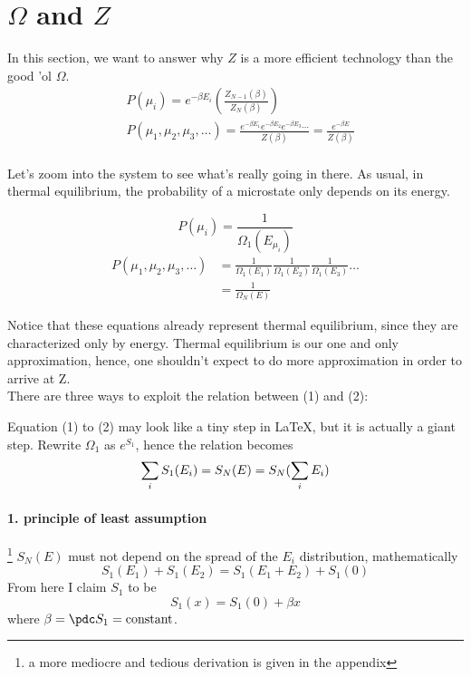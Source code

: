 

\usepackage{multicol}



    \section{$\Omega$ and $Z$}
    \newcommand{\ThE}{thermal equilibrium}
        
        In this section, we want to answer why $Z$ is a more efficient technology than the good 'ol $\Omega$.
        \begin{align*}
            &P(\mu_i) = e^{-\beta E_i}
            \left( \frac{Z_{N-1}(\beta)}{Z_N(\beta)}\right)\\
            &P(\mu_1,\mu_2,\mu_3,\ldots) = \frac{e^{-\beta E_1} e^{-\beta E_2} e^{-\beta E_3} \cdots}{Z(\beta)} = \frac{e^{-\beta E} }{Z(\beta)}\\
        \end{align*}

        Let's zoom into the system to see what's really going in there. As usual, in \ThE, the probability of a microstate only depends on its energy.

            \[P(\mu_i) = \frac1{\Omega_1(E_{\mu_i})} \]
        \begin{align}
            P(\mu_1,\mu_2,\mu_3,\ldots) &= \frac1{\Omega_1(E_1)} \frac1{\Omega_1(E_2)} \frac1{\Omega_1(E_3)} \ldots \\
            &= \frac1{\Omega_N(E)}
        \end{align}

        Notice that these equations already represent thermal equilibrium, since they are characterized only by energy. Thermal equilibrium is our one and only approximation, hence, one shouldn't expect to do more approximation in order to arrive at Z.\\
        There are three ways to exploit the relation between (1) and (2):

        \newcommand{\aE}{\epsilon}
        \newcommand{\soi}{\sum_i}
        \newcommand{\Stothei}[1] {{\hat\pdc}^{#1} S_1(\aE)}
        Equation (1) to (2) may look like a tiny step in \LaTeX, but it is actually a giant step.
        Rewrite $\Omega_1$ as $e^{ S_1}$, hence the relation becomes
        \[
            \soi S_1(E_i) = S_N(E) = S_N(\soi E_i) \\
            \]


            \paragraph{1. principle of least assumption} \footnote{a more mediocre and tedious derivation is given in the appendix}
$S_N(E)$ must not depend on the spread of the $E_i$ distribution, mathematically
        \[S_1(E_1) + S_1(E_2) = S_1(E_1+E_2) + S_1(0) \]
            From here I claim $S_1$ to be
            \[ S_1(x) = S_1(0) + \beta x\]
            where $\beta = \pdc S_1 = \mathrm{constant}$.


